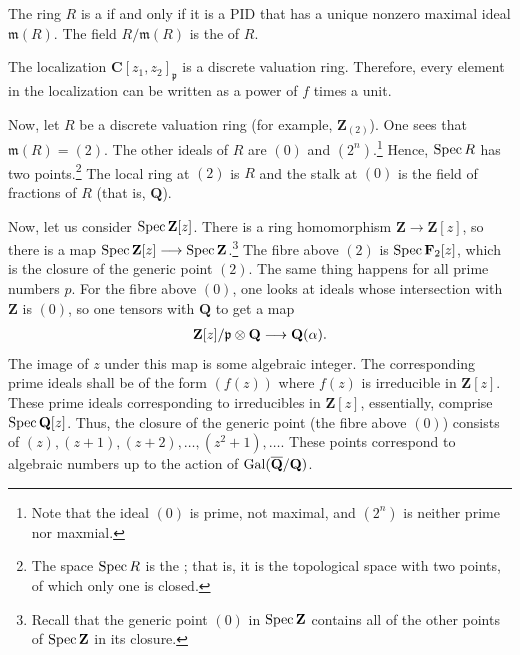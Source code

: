 \documentclass [11 pt, oneside] {article}
\begin{document}
\begin{definition}[ ]\label{}
The ring $R$ is a  if and only if it is a PID that has a unique nonzero maximal ideal $\mathfrak{m}(R)$. The field $R/\mathfrak{m}(R)$ is the  of $R$. 
\end{definition}

\begin{remark}
The localization $\mathbf{C}[z_1,z_2]_{\mathfrak{p}}$ is a discrete valuation ring. Therefore, every element in the localization can be written as a power of $f$ times a unit.	
\end{remark}

Now, let $R$ be a discrete valuation ring (for example, $\mathbf{Z}_{(2)}$). One sees that $\mathfrak{m}(R) =  (2) $. The other ideals of $R$ are $(0)$ and $(2^n)$.\footnote{Note that the ideal $(0)$ is prime, not maximal, and $(2^n)$ is neither prime nor maxmial.} Hence, $\operatorname{Spec} R$ has two points.\footnote{The space $\operatorname{Spec} R$ is the ; that is, it is the topological space with two points, of which only one is closed.} The local ring at $(2)$ is $R$ and the stalk at $(0)$ is the field of fractions of $R$ (that is, $\mathbf{Q}$).

Now, let us consider $\operatorname{Spec} \mathbf{Z}[z] $. There is a ring homomorphism $\mathbf{Z}\longrightarrow \mathbf{Z}[z]$, so there is a map $\operatorname{Spec} \mathbf{Z}[z] \longrightarrow \operatorname{Spec} \mathbf{Z}$.\footnote{Recall that the generic point $(0)$ in $\operatorname{Spec} \mathbf{Z}$ contains all of the other points of $\operatorname{Spec}\mathbf{Z}$ in its closure.} The fibre above $(2)$ is $\operatorname{Spec}\mathbf{F}_{2}[z]$, which is the closure of the generic point $(2)$. The same thing happens for all prime numbers $p$. For the fibre above $(0)$, one looks at ideals whose intersection with $\mathbf{Z}$ is $(0)$, so one tensors with $\mathbf{Q}$ to get a map
\begin{align*}
	\mathbf{Z}[z]/\mathfrak{p}\otimes \mathbf{Q}\longrightarrow \mathbf{Q}(\alpha). 
\end{align*}
The image of $z$ under this map is some algebraic integer. The corresponding prime ideals shall be of the form $(f(z))$ where $f(z) $ is irreducible in $\mathbf{Z}[z]$. These prime ideals corresponding to irreducibles in $\mathbf{Z}[z]$, essentially, comprise $\operatorname{Spec} \mathbf{Q}[z]$. Thus, the closure of the generic point (the fibre above $(0)$) consists of $(z),  (z+1), (z+2),\hdots,  (z^2+1),\hdots$. These points correspond to algebraic numbers up to the action of $\operatorname{Gal} (\overline{\mathbf{Q}}/\mathbf{Q})$.
\end{document}
